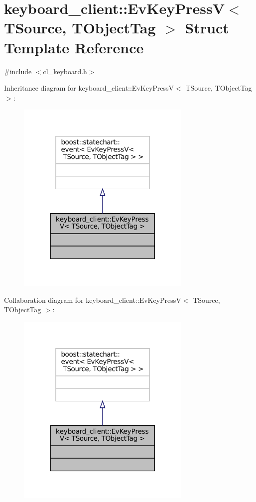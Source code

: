 \hypertarget{structkeyboard__client_1_1EvKeyPressV}{}\section{keyboard\+\_\+client\+:\+:Ev\+Key\+PressV$<$ T\+Source, T\+Object\+Tag $>$ Struct Template Reference}
\label{structkeyboard__client_1_1EvKeyPressV}


{\ttfamily \#include $<$cl\+\_\+keyboard.\+h$>$}



Inheritance diagram for keyboard\+\_\+client\+:\+:Ev\+Key\+PressV$<$ T\+Source, T\+Object\+Tag $>$\+:
\nopagebreak
\begin{figure}[H]
\begin{center}
\leavevmode
\includegraphics[width=237pt]{structkeyboard__client_1_1EvKeyPressV__inherit__graph}
\end{center}
\end{figure}


Collaboration diagram for keyboard\+\_\+client\+:\+:Ev\+Key\+PressV$<$ T\+Source, T\+Object\+Tag $>$\+:
\nopagebreak
\begin{figure}[H]
\begin{center}
\leavevmode
\includegraphics[width=237pt]{structkeyboard__client_1_1EvKeyPressV__coll__graph}
\end{center}
\end{figure}


